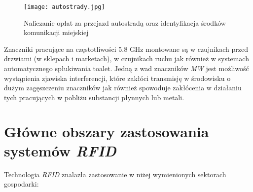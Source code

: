 \begin{itemize}
	\begin{figure}[h!]
	\centering
	    \texttt{[image: autostrady.jpg]}
	    \caption{Naliczanie opłat za przejazd autostradą oraz identyfikacja środków komunikacji miejskiej}
	\end{figure}

	Znaczniki pracujące na częstotliwości 5.8 GHz montowane są w czujnikach przed drzwiami (w sklepach i marketach), w czujnikach ruchu jak również w systemach automatycznego spłukiwania toalet.
	Jedną z wad znaczników \emph{MW} jest możliwość wystąpienia zjawiska interferencji, które zakłóci  transmisję w środowisku o dużym zagęszczeniu znaczników jak również spowoduje zakłócenia w działaniu tych pracujących  w pobliżu substancji płynnych lub metali.

\end{itemize}

\newpage

\section{Główne obszary zastosowania systemów \emph{RFID}}

\noindent 
Technologia \emph{RFID} znalazła zastosowanie w niżej wymienionych sektorach gospodarki: 

